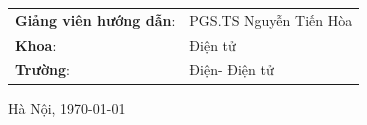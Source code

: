 \begin{titlepage}
\begin{center}
\begin{table}[H]
    \centering
    \begin{tabular}{l l}
\textbf{\fontsize{14pt}{0pt}\selectfont Giảng viên hướng dẫn}: & \fontsize{13pt}{0pt}\selectfont PGS.TS Nguyễn Tiến Hòa \\
\textbf{\fontsize{14pt}{0pt}\selectfont Khoa}: & \fontsize{14pt}{0pt}\selectfont Điện tử \\
\textbf{\fontsize{14pt}{0pt}\selectfont Trường}: & \fontsize{14pt}{0pt}\selectfont Điện- Điện tử \\
\end{tabular}
\end{table}

\vspace{3cm}
 \fontsize{14pt}{0pt}\selectfont Hà Nội, \today
\end{center}
\end{titlepage}
\cleardoublepage